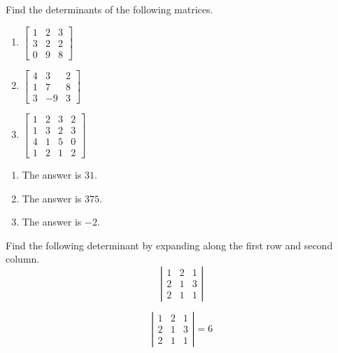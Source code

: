\documentclass{ximera}
\begin{document}
\begin{problem}\label{prb:7.3} Find the determinants of the following matrices.
\begin{enumerate}
\item $\left[
\begin{array}{rrr}
1 & 2 & 3 \\
3 & 2 & 2 \\
0 & 9 & 8
\end{array}
\right] $
\item $\left[
\begin{array}{rrr}
4 & 3 & 2 \\
1 & 7 & 8 \\
3 & -9 & 3
\end{array}
\right] $
\item $\left[
\begin{array}{rrrr}
1 & 2 & 3 & 2 \\
1 & 3 & 2 & 3 \\
4 & 1 & 5 & 0 \\
1 & 2 & 1 & 2
\end{array}
\right] $
\end{enumerate}
\begin{hint}
\begin{enumerate}
\item The answer is $31$.
\item The answer is $375$.
\item The answer is $-2$.
\end{enumerate}
\end{hint}
\end{problem}

\begin{problem}\label{prb:7.4} Find the following determinant by expanding along the first row and
second column.
\begin{equation*}
\left|
\begin{array}{rrr}
1 & 2 & 1 \\
2 & 1 & 3 \\
2 & 1 & 1
\end{array}
\right|
\end{equation*}
\begin{hint}
\[
\left|
\begin{array}{ccc}
1 & 2 & 1 \\
2 & 1 & 3 \\
2 & 1 & 1
\end{array}
\right| =  6
\]
\end{hint}
\end{problem}
\end{document}
